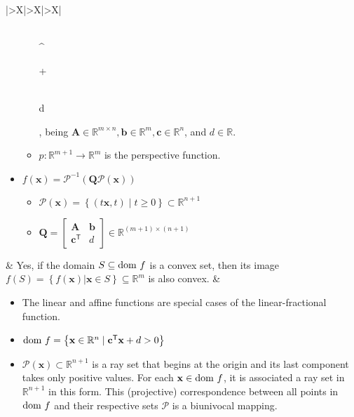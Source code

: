 \documentclass{article}
\begin{document}
\begin{table}[ht!]
\begin{tabularx}{\textwidth}{|>{\setlength\hsize{1\hsize}\setlength\linewidth{\hsize}}X|>{\setlength\hsize{.9\hsize}\setlength\linewidth{\hsize}}X|>{\setlength\hsize{1.1\hsize}\setlength\linewidth{\hsize}}X|}
\begin{itemize}[leftmargin=*]
\begin{itemize}[label={$\triangleright$}]
\begin{bmatrix}
                        \\
                        ^
                    \end{bmatrix}  + \begin{bmatrix}
                         \\
                        d
                    \end{bmatrix}\), being \(\mathbf{A}\in \mathbb{R}^{m \times n}, \mathbf{b} \in \mathbb{R}^{m}, \mathbf{c} \in \mathbb{R}^{n}\), and \(d \in \mathbb{R}\).
                    \item \(p: \mathbb{R}^{m+1} \rightarrow \mathbb{R}^{m}\) is the perspective function.
                \end{itemize}
            \item \(f(\mathbf{x}) = \mathcal{P}^{-1}(\mathbf{Q}\mathcal{P}(\mathbf{x}))\)
                \begin{itemize}[label={$\triangleright$}]
                    \item \(\mathcal{P}(\mathbf{x}) = \left\{ (t\mathbf{x}, t) \mid t \geq 0 \right\} \subset \mathbb{R}^{n+1}\)
                    \item \(\mathbf{Q} = \begin{bmatrix}
                        \mathbf{A} & \mathbf{b} \\
                        \mathbf{c}^\mathsf{T} & d
                    \end{bmatrix} \in \mathbb{R}^{(m+1)\times(n+1)}\)
                \end{itemize}
        \end{itemize} & Yes, if the domain \(S \subseteq \textnormal{dom } f\) is a convex set, then its image \(f(S) = \left\{ f(\mathbf{x})|\mathbf{x}\in S \right\} \subseteq \mathbb{R}^{m}\) is also convex. & \vspace{-3.5ex} \begin{itemize}[leftmargin=*]
            \item The linear and affine functions are special cases of the linear-fractional function.
            \item \(\textnormal{dom } f = \left\{ \mathbf{x} \in \mathbb{R}^{n} \mid \mathbf{c}^\mathsf{T} \mathbf{x} + d > 0 \right\}\)
            \item \(\mathcal{P}(\mathbf{x}) \subset \mathbb{R}^{n+1}\) is a ray set that begins at the origin and its last component takes only positive values. For each \(\mathbf{x} \in \textnormal{dom } f\), it is associated a ray set in \(\mathbb{R}^{n+1}\) in this form. This (projective) correspondence between all points in \(\textnormal{dom } f\) and their respective sets \(\mathcal{P}\) is a biunivocal mapping.

\end{itemize}
\end{tabularx}
\end{table}
\end{document}
